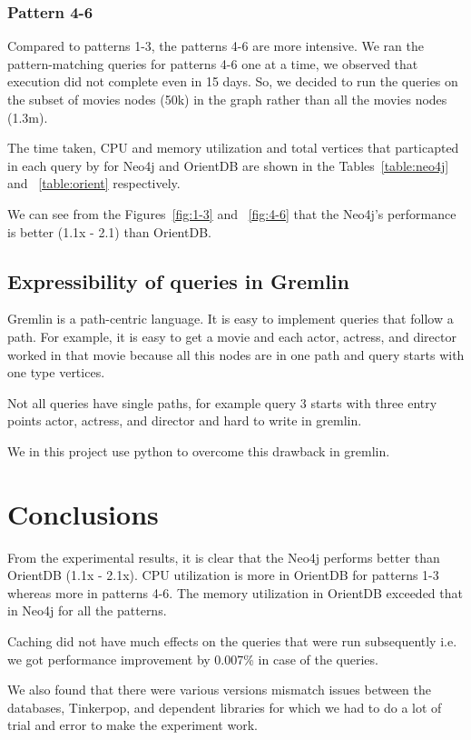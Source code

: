 \subsubsection{Pattern 4-6}

Compared to patterns 1-3, the patterns 4-6 are more intensive. We ran the pattern-matching queries for patterns 4-6 one at a time, we observed that execution did not complete even in 15 days. So, we decided to run the queries on the subset of movies nodes (50k) in the graph rather than all the movies nodes (1.3m). 

The time taken, CPU and memory utilization and total vertices that particapted in each query by for Neo4j and OrientDB are shown in the Tables~\ref{table:neo4j} and ~\ref{table:orient} respectively.

We can see from the Figures~\ref{fig:1-3} and ~\ref{fig:4-6} that the Neo4j's performance is better (1.1x - 2.1) than OrientDB.

\subsection{Expressibility of queries in Gremlin}

Gremlin is a path-centric language. It is easy to implement queries that follow a path. For example, it is easy to get a movie and each actor, actress, and director worked in that movie because all this nodes are in one path and query starts with one type vertices. 

Not all queries have single paths, for example query 3 starts with three entry points actor, actress, and director and hard to write in gremlin.

We in this project use python to overcome this drawback in gremlin. 

\section{Conclusions}
From the experimental results, it is clear that the Neo4j performs better than OrientDB (1.1x - 2.1x). CPU utilization is more in OrientDB  for patterns 1-3 whereas more in patterns 4-6. The memory utilization in OrientDB exceeded that in Neo4j for all the patterns.

Caching did not have much effects on the queries that were run subsequently i.e. we got performance improvement by 0.007\% in case of the queries.

We also found that there were various versions mismatch issues between the databases, Tinkerpop, and dependent libraries for which we had to do a lot of trial and error to make the experiment work.

